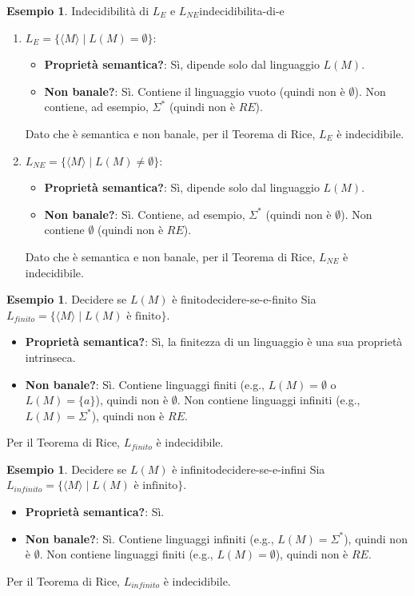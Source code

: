 \documentclass[a4paper]{article}
\theoremstyle{definition} %
\newtheorem{example}[theorem]{Esempio}
\begin{document}
\begin{example}{Indecidibilità di $L_E$ e $L_{NE}$}{indecidibilita-di-e}
\begin{enumerate}
    \item $L_E = \{\langle M \rangle \mid L(M) = \emptyset\}$:
    \begin{itemize}
        \item \textbf{Proprietà semantica?}: Sì, dipende solo dal linguaggio $L(M)$.
        \item \textbf{Non banale?}: Sì. Contiene il linguaggio vuoto (quindi non è $\emptyset$). Non contiene, ad esempio, $\Sigma^*$ (quindi non è $RE$).
    \end{itemize}
    Dato che è semantica e non banale, per il Teorema di Rice, $L_E$ è indecidibile.
    \item $L_{NE} = \{\langle M \rangle \mid L(M) \neq \emptyset\}$:
    \begin{itemize}
        \item \textbf{Proprietà semantica?}: Sì, dipende solo dal linguaggio $L(M)$.
        \item \textbf{Non banale?}: Sì. Contiene, ad esempio, $\Sigma^*$ (quindi non è $\emptyset$). Non contiene $\emptyset$ (quindi non è $RE$).
    \end{itemize}
    Dato che è semantica e non banale, per il Teorema di Rice, $L_{NE}$ è indecidibile.
\end{enumerate}
\end{example}

\begin{example}{Decidere se $L(M)$ è finito}{decidere-se-e-finito}
Sia $L_{finito} = \{\langle M \rangle \mid L(M) \text{ è finito}\}$.
\begin{itemize}
    \item \textbf{Proprietà semantica?}: Sì, la finitezza di un linguaggio è una sua proprietà intrinseca.
    \item \textbf{Non banale?}: Sì. Contiene linguaggi finiti (e.g., $L(M)=\emptyset$ o $L(M)=\{a\}$), quindi non è $\emptyset$. Non contiene linguaggi infiniti (e.g., $L(M)=\Sigma^*$), quindi non è $RE$.
\end{itemize}
Per il Teorema di Rice, $L_{finito}$ è indecidibile.
\end{example}

\begin{example}{Decidere se $L(M)$ è infinito}{decidere-se-e-infini}
Sia $L_{infinito} = \{\langle M \rangle \mid L(M) \text{ è infinito}\}$.
\begin{itemize}
    \item \textbf{Proprietà semantica?}: Sì.
    \item \textbf{Non banale?}: Sì. Contiene linguaggi infiniti (e.g., $L(M)=\Sigma^*$), quindi non è $\emptyset$. Non contiene linguaggi finiti (e.g., $L(M)=\emptyset$), quindi non è $RE$.
\end{itemize}
Per il Teorema di Rice, $L_{infinito}$ è indecidibile.
\end{example}
\end{document}
